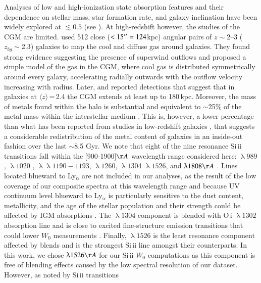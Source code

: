 \documentclass[longauth]{aa}
\begin{document}
Analyses of low and high-ionization state absorption features and their
dependence on stellar mass, star formation rate, and galaxy inclination have
been widely explored at $\lesssim0.5$ (see \citealt
{Tumlinson17,Kacprzak17}). At high-redshift however, the studies of the CGM
are limited. %
\cite{Steidel10} used 512 close ($<15^{\prime\prime}=124$kpc) angular pairs of
$z\sim$2--3 ($z_{bg}\sim$2.3) galaxies to map the cool and diffuse gas
around galaxies. They found strong evidence suggesting the presence of
superwind outflows and proposed a simple model of the gas in the CGM, where
cool gas is distributed symmetrically around every galaxy, accelerating
radially outwards with the outflow velocity increasing with radius. Later,
\cite{Turner14} and \cite{Lau16} reported detections that suggest that in
galaxies at $\langle z \rangle$\,=\,2.4 the CGM extends at least up to
180\,kpc. Moreover, the mass of metals found within the halo is substantial
and equivalent to $\sim$25\% of the metal mass within the interstellar
medium \citep{Rudie19}. This is, however, a lower percentage than what has
been reported from studies in low-redshift galaxies \citep{Werk14}, that
suggests a considerable redistribution of the metal content of galaxies in
an inside-out fashion over the last $\sim$8.5 Gyr. We note that eight of the
nine resonance Si\,{\sc ii} transitions fall within the
[900-1900]$\AA$ wavelength range considered here: $\uplambda 989$,
$\uplambda 1020$ , $\uplambda\uplambda 1190-1193$, $\uplambda 1260$,
$\uplambda 1304$ $\uplambda 1526$, and $\uplambda 1808 \AA$ \citep
{Shull81}. Lines located blueward to Ly$_{\upalpha}$ are not included in our
analyses, as the result of the low coverage of our composite spectra at this
wavelength range and because UV continuum level blueward to Ly$_
{\upalpha}$ is particularly sensitive to the dust content, metallicity, and
the age of the stellar population \citep{Trainor15} and their strength could
be affected by IGM absorptions \citep{Shapley03}. The $\uplambda1304$
component is blended with  O\,{\sc i} $\uplambda1302$ absorption line and is
close to excited fine-structure emission transitions that could lower $W_
{0}$ measurements \citep{Trainor15}. Finally,  $\uplambda1526$ is the least
resonance component affected by blends \citep{Shapley03} and is the
strongest Si\,{\sc ii} line amongst their counterparts. In this work, we
chose $\uplambda 1526 \AA$ for our Si\,{\sc ii} $W_{0}$ computations as this
component is free of blending effects caused by  the low spectral resolution
of our dataset. However, as noted by \cite{Jones18} Si\,{\sc ii} transitions
\end{document}
